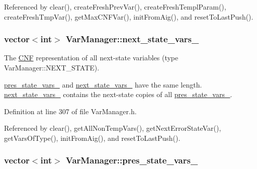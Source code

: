 Referenced by clear(), create\-Fresh\-Prev\-Var(), create\-Fresh\-Templ\-Param(), create\-Fresh\-Tmp\-Var(), get\-Max\-C\-N\-F\-Var(), init\-From\-Aig(), and reset\-To\-Last\-Push().

\hypertarget{classVarManager_a2a697fcb384c73821d88104ac904f4e9}{
\subsubsection[{next\-\_\-state\-\_\-vars\-\_\-}]{\setlength{\rightskip}{0pt plus 5cm}vector$<$int$>$ Var\-Manager\-::next\-\_\-state\-\_\-vars\-\_\-\hspace{0.3cm}{\ttfamily [protected]}}}\label{classVarManager_a2a697fcb384c73821d88104ac904f4e9}


The \hyperlink{classCNF}{C\-N\-F} representation of all next-\/state variables (type Var\-Manager\-::\-N\-E\-X\-T\-\_\-\-S\-T\-A\-T\-E). 

\hyperlink{classVarManager_a25edf00cec0e31f140aabdf3a245a54c}{pres\-\_\-state\-\_\-vars\-\_\-} and \hyperlink{classVarManager_a2a697fcb384c73821d88104ac904f4e9}{next\-\_\-state\-\_\-vars\-\_\-} have the same length. \hyperlink{classVarManager_a2a697fcb384c73821d88104ac904f4e9}{next\-\_\-state\-\_\-vars\-\_\-} contains the next-\/state copies of all \hyperlink{classVarManager_a25edf00cec0e31f140aabdf3a245a54c}{pres\-\_\-state\-\_\-vars\-\_\-}. 

Definition at line 307 of file Var\-Manager.\-h.



Referenced by clear(), get\-All\-Non\-Temp\-Vars(), get\-Next\-Error\-State\-Var(), get\-Vars\-Of\-Type(), init\-From\-Aig(), and reset\-To\-Last\-Push().

\hypertarget{classVarManager_a25edf00cec0e31f140aabdf3a245a54c}{
\subsubsection[{pres\-\_\-state\-\_\-vars\-\_\-}]{\setlength{\rightskip}{0pt plus 5cm}vector$<$int$>$ Var\-Manager\-::pres\-\_\-state\-\_\-vars\-\_\-\hspace{0.3cm}{\ttfamily [protected]}}}\label{classVarManager_a25edf00cec0e31f140aabdf3a245a54c}


